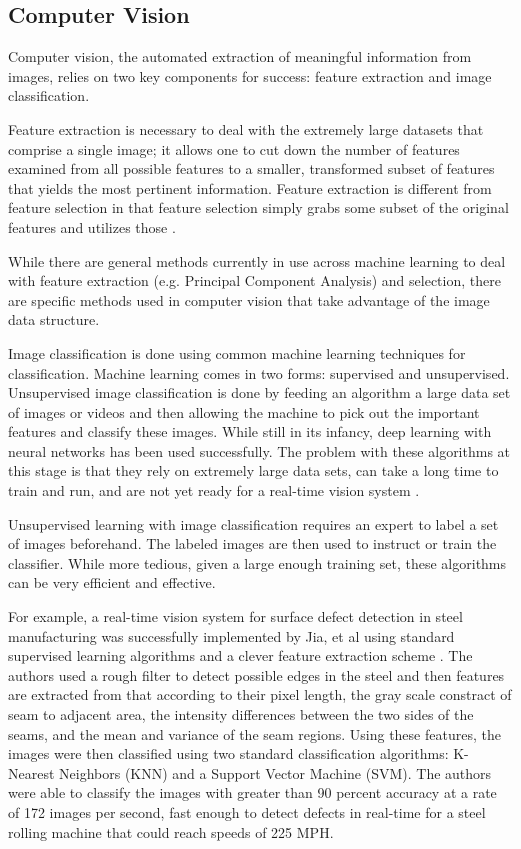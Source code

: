 \documentclass[letterpaper, 10 pt, conference]{ieeeconf}  %
\begin{document}
\subsection{Computer Vision}

Computer vision, the automated extraction of meaningful information from images, relies on two key components for success: feature extraction and image classification. 

Feature extraction is necessary to deal with the extremely large datasets that comprise a single image; it allows one to cut down the number of features examined from all possible features to a smaller, transformed subset of features that yields the most pertinent information. Feature extraction is different from feature selection in that feature selection simply grabs some subset of the original features and utilizes those \cite{featSelExt}.

While there are general methods currently in use across machine learning to deal with feature extraction (e.g. Principal Component Analysis) and selection, there are specific methods used in computer vision that take advantage of the image data structure.

Image classification is done using common machine learning techniques for classification. Machine learning comes in two forms: supervised and unsupervised. Unsupervised image classification is done by feeding an algorithm a large data set of images or videos and then allowing the machine to pick out the important features and classify these images. While still in its infancy, deep learning with neural networks has been used successfully. The problem with these algorithms at this stage is that they rely on extremely large data sets, can take a long time to train and run, and are not yet ready for a real-time vision system \cite{deepLearning1}. 

Unsupervised learning with image classification requires an expert to label a set of images beforehand. The labeled images are then used to instruct or train the classifier. While more tedious, given a large enough training set, these algorithms can be very efficient and effective.

For example, a real-time vision system for surface defect detection in steel manufacturing was successfully implemented by Jia, et al using standard supervised learning algorithms and a clever feature extraction scheme \cite{steelDefect}. The authors used a rough filter to detect possible edges in the steel and then features are extracted from that according to their pixel length, the gray scale constract of seam to adjacent area, the intensity differences between the two sides of the seams, and the mean and variance of the seam regions. Using these features, the images were then classified using two standard classification algorithms: K-Nearest Neighbors (KNN) and a Support Vector Machine (SVM). The authors were able to classify the images with greater than 90 percent accuracy at a rate of 172 images per second, fast enough to detect defects in real-time for a steel rolling machine that could reach speeds of 225 MPH.
\end{document}
